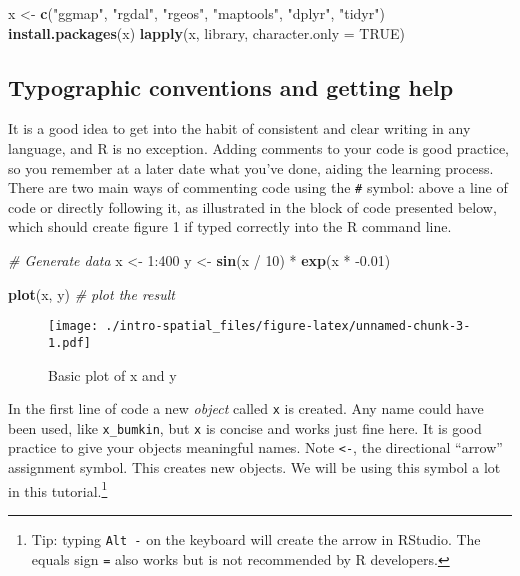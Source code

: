\documentclass[]{article}
\newenvironment{Shaded}{}{}
\newcommand{\KeywordTok}[1]{\textcolor[rgb]{0.00,0.44,0.13}{\textbf{{#1}}}}
\newcommand{\DataTypeTok}[1]{\textcolor[rgb]{0.56,0.13,0.00}{{#1}}}
\newcommand{\DecValTok}[1]{\textcolor[rgb]{0.25,0.63,0.44}{{#1}}}
\newcommand{\FloatTok}[1]{\textcolor[rgb]{0.25,0.63,0.44}{{#1}}}
\newcommand{\StringTok}[1]{\textcolor[rgb]{0.25,0.44,0.63}{{#1}}}
\newcommand{\CommentTok}[1]{\textcolor[rgb]{0.38,0.63,0.69}{\textit{{#1}}}}
\newcommand{\OtherTok}[1]{\textcolor[rgb]{0.00,0.44,0.13}{{#1}}}
\newcommand{\NormalTok}[1]{{#1}}
\begin{document}
\begin{Shaded}
\begin{Highlighting}[]
\NormalTok{x <-}\StringTok{ }\KeywordTok{c}\NormalTok{(}\StringTok{"ggmap"}\NormalTok{, }\StringTok{"rgdal"}\NormalTok{, }\StringTok{"rgeos"}\NormalTok{, }\StringTok{"maptools"}\NormalTok{, }\StringTok{"dplyr"}\NormalTok{, }\StringTok{"tidyr"}\NormalTok{)}
\KeywordTok{install.packages}\NormalTok{(x)}
\KeywordTok{lapply}\NormalTok{(x, library, }\DataTypeTok{character.only =} \OtherTok{TRUE}\NormalTok{)}
\end{Highlighting}
\end{Shaded}

\subsection{Typographic conventions and getting
help}\label{typographic-conventions-and-getting-help}

It is a good idea to get into the habit of consistent and clear writing
in any language, and R is no exception. Adding comments to your code is
good practice, so you remember at a later date what you've done, aiding
the learning process. There are two main ways of commenting code using
the \texttt{\#} symbol: above a line of code or directly following it,
as illustrated in the block of code presented below, which should create
figure 1 if typed correctly into the R command line.

\begin{Shaded}
\begin{Highlighting}[]
\CommentTok{# Generate data}
\NormalTok{x <-}\StringTok{ }\DecValTok{1}\NormalTok{:}\DecValTok{400}
\NormalTok{y <-}\StringTok{ }\KeywordTok{sin}\NormalTok{(x /}\StringTok{ }\DecValTok{10}\NormalTok{) *}\StringTok{ }\KeywordTok{exp}\NormalTok{(x *}\StringTok{ }\NormalTok{-}\FloatTok{0.01}\NormalTok{)}

\KeywordTok{plot}\NormalTok{(x, y) }\CommentTok{# plot the result}
\end{Highlighting}
\end{Shaded}

\begin{figure}[htbp]
\centering
\texttt{[image: ./intro-spatial\_files/figure-latex/unnamed-chunk-3-1.pdf]}
\caption{Basic plot of x and y}
\end{figure}

In the first line of code a new \emph{object} called \texttt{x} is
created. Any name could have been used, like \texttt{x\_bumkin}, but
\texttt{x} is concise and works just fine here. It is good practice to
give your objects meaningful names. Note \texttt{\textless{}-}, the
directional ``arrow'' assignment symbol. This creates new objects. We
will be using this symbol a lot in this tutorial.\footnote{Tip: typing
  \texttt{Alt -} on the keyboard will create the arrow in RStudio. The
  equals sign \texttt{=} also works but is not recommended by R
  developers.}
\end{document}
